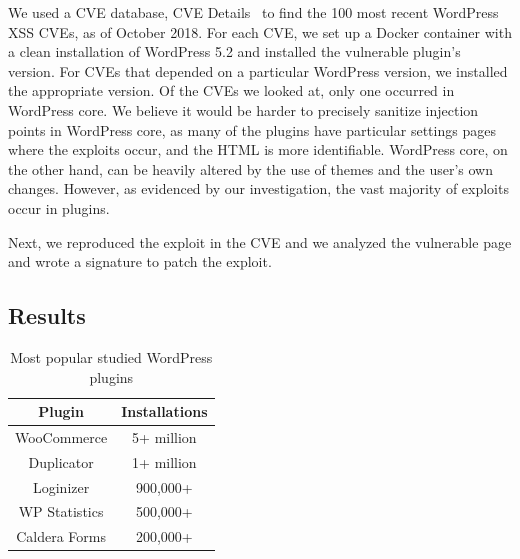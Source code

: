 We used a CVE database, CVE Details~\cite{cvedetails} to
find the 100 most recent WordPress \ac{XSS} CVEs, as of
October 2018. %
%
For each CVE, we set up a Docker container with a clean installation
of WordPress 5.2 and installed the vulnerable plugin's version. 
For CVEs that depended on a particular WordPress version, we
installed the appropriate version. Of the CVEs we looked at, only
one occurred in WordPress core. We believe it would be harder
to precisely sanitize injection points in WordPress core, as many of
the plugins have particular settings pages where the exploits occur,
and the HTML is more identifiable. WordPress core, on the other hand,
can be heavily altered by the use of themes and the user's own
changes. However, as evidenced by our investigation, the vast majority
of exploits occur in plugins.
 
Next, we reproduced the exploit in the CVE and we analyzed the
vulnerable page and wrote a signature to patch the exploit.

\subsection{Results}

\begin{table}[h!]
	\begin{center}
		\begin{tabular}{c c} 
			\hline
			\textbf{Plugin} & \textbf{Installations}\\ [1ex] 
			\hline
			WooCommerce  & 5+ million  \\  
			Duplicator & 1+ million \\  
			Loginizer & 900,000+ \\  
			WP Statistics & 500,000+ \\  
			Caldera Forms & 200,000+ \\   
			\hline
		\end{tabular}
		\caption{Most popular studied WordPress plugins}
		\label{table:1}
	\end{center}
\end{table}

